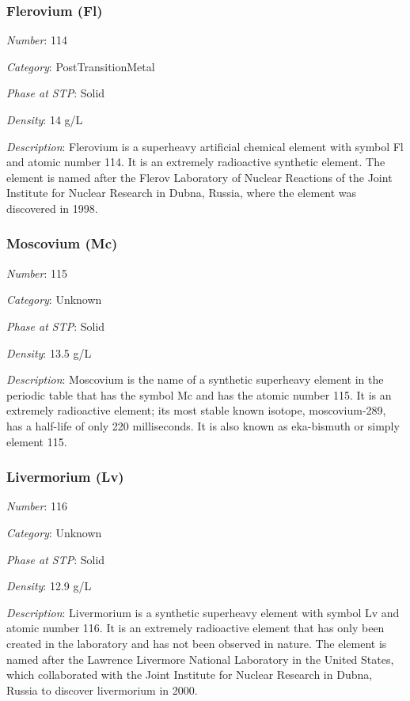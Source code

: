 \documentclass{article}
\begin{document}
\hypertarget{subsubsection::Fl}{}\subsubsection{Flerovium (Fl)}

\textit{Number}: 114

\textit{Category}: PostTransitionMetal

\textit{Phase at STP}: Solid

\textit{Density}: 14 g/L

\textit{Description}: Flerovium is a superheavy artificial chemical element with symbol Fl and atomic number 114. It is an extremely radioactive synthetic element. The element is named after the Flerov Laboratory of Nuclear Reactions of the Joint Institute for Nuclear Research in Dubna, Russia, where the element was discovered in 1998.

\hypertarget{subsubsection::Mc}{}\subsubsection{Moscovium (Mc)}

\textit{Number}: 115

\textit{Category}: Unknown

\textit{Phase at STP}: Solid

\textit{Density}: 13.5 g/L

\textit{Description}: Moscovium is the name of a synthetic superheavy element in the periodic table that has the symbol Mc and has the atomic number 115. It is an extremely radioactive element; its most stable known isotope, moscovium-289, has a half-life of only 220 milliseconds. It is also known as eka-bismuth or simply element 115.

\hypertarget{subsubsection::Lv}{}\subsubsection{Livermorium (Lv)}

\textit{Number}: 116

\textit{Category}: Unknown

\textit{Phase at STP}: Solid

\textit{Density}: 12.9 g/L

\textit{Description}: Livermorium is a synthetic superheavy element with symbol Lv and atomic number 116. It is an extremely radioactive element that has only been created in the laboratory and has not been observed in nature. The element is named after the Lawrence Livermore National Laboratory in the United States, which collaborated with the Joint Institute for Nuclear Research in Dubna, Russia to discover livermorium in 2000.
\end{document}
